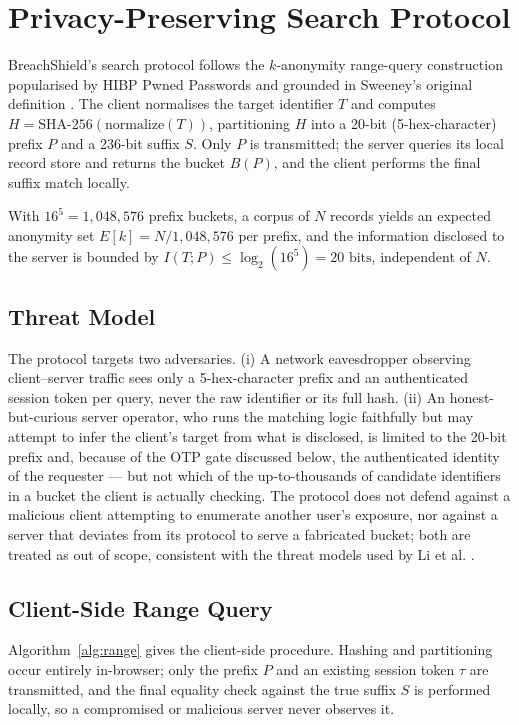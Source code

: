 \documentclass[conference]{IEEEtran}
\begin{document}
\section{Privacy-Preserving Search Protocol}
\label{sec:protocol}
BreachShield's search protocol follows the $k$-anonymity range-query construction popularised by HIBP Pwned Passwords \cite{li2019protocols} and grounded in Sweeney's original definition \cite{sweeney2002k}. The client normalises the target identifier $T$ and computes $H = \text{SHA-256}(\text{normalize}(T))$, partitioning $H$ into a 20-bit (5-hex-character) prefix $P$ and a 236-bit suffix $S$. Only $P$ is transmitted; the server queries its local record store and returns the bucket $B(P)$, and the client performs the final suffix match locally.

With $16^5 = 1,048,576$ prefix buckets, a corpus of $N$ records yields an expected anonymity set $E[k] = N / 1,048,576$ per prefix, and the information disclosed to the server is bounded by $I(T; P) \le \log_2(16^5) = 20\text{ bits}$, independent of $N$.

\subsection{Threat Model}
The protocol targets two adversaries. (i) A network eavesdropper observing client--server traffic sees only a 5-hex-character prefix and an authenticated session token per query, never the raw identifier or its full hash. (ii) An honest-but-curious server operator, who runs the matching logic faithfully but may attempt to infer the client's target from what is disclosed, is limited to the 20-bit prefix and, because of the OTP gate discussed below, the authenticated identity of the requester --- but not which of the up-to-thousands of candidate identifiers in a bucket the client is actually checking. The protocol does not defend against a malicious client attempting to enumerate another user's exposure, nor against a server that deviates from its protocol to serve a fabricated bucket; both are treated as out of scope, consistent with the threat models used by Li et al. \cite{li2019protocols}.

\subsection{Client-Side Range Query}
Algorithm~\ref{alg:range} gives the client-side procedure. Hashing and partitioning occur entirely in-browser; only the prefix $P$ and an existing session token $\tau$ are transmitted, and the final equality check against the true suffix $S$ is performed locally, so a compromised or malicious server never observes it.
\end{document}
